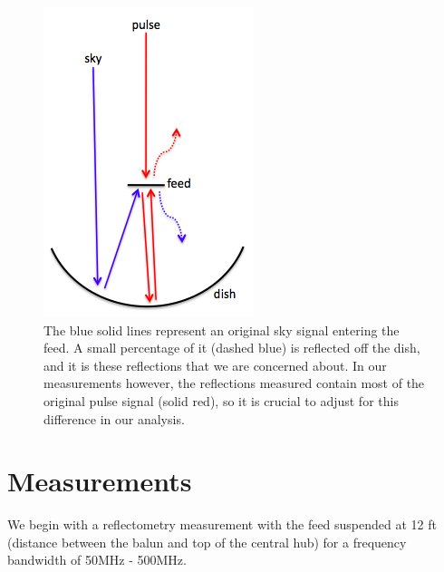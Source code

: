 \documentclass[12pt,preprint]{aastex}
\begin{document}
\begin{figure}
\centering
\includegraphics[totalheight=0.5\textheight]{plots/reflection_cartoon.png}
\caption{The blue solid lines represent an original sky signal entering the feed. A small percentage of it (dashed blue) is reflected off the dish, and it is these reflections that we are concerned about. In our measurements however, the reflections measured contain most of the original pulse signal (solid red), so it is crucial to adjust for this difference in our analysis.}
\end{figure}


\section{Measurements}

We begin with a reflectometry measurement with the feed suspended at 12 ft (distance between the balun and top of the central hub) for a frequency bandwidth of 50MHz - 500MHz.
\end{document}
